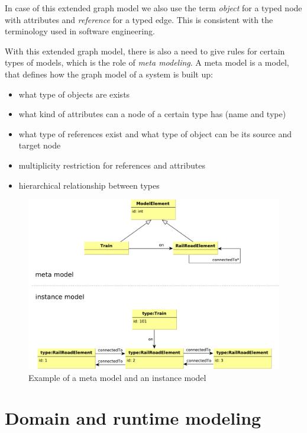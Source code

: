 In case of this extended graph model we also use the term \emph{object} for a typed node with attributes and \emph{reference} for a typed edge. This is consistent with the terminology used in software engineering.

With this extended graph model, there is also a need to give rules for certain types of models, which is the role of \emph{meta modeling}.
A meta model is a model, that defines how the graph model of a system is built up:
\begin{itemize}
	\item what type of objects are exists
	\item what kind of attributes can a node of a certain type has (name and type)
	\item what type of references exist and what type of object can be its source and target node
	\item multiplicity restriction for references and attributes
	\item hierarchical relationship between types
\end{itemize}


\begin{figure}[h]
	\begin{center}
		\includegraphics[width=\textwidth]{figures/metamodel.pdf}
		\caption{ Example of a meta model and an instance model }
		\label{fig:metamodel}
	\end{center}
\end{figure}


\section{Domain and runtime modeling}


